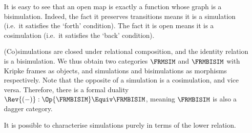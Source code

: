 It is easy to see that an open map is exactly a function whose graph is a
bisimulation. Indeed, the fact it preserves transitions means it is a simulation
(i.e.\ it satisfies the `forth' condition). The fact it is open means it is a
cosimulation (i.e.\ it satisfies the `back' condition).

(Co)simulations are closed under relational composition, and the identity
relation is a bisimulation. We thus obtain two categories \(\FRMSIM\) and
\(\FRMBISIM\) with Kripke frames as objects, and simulations and bisimulations
as morphisms respectively. Note that the opposite of a simulation is a
cosimulation, and vice versa. Therefore, there is a formal duality \(\Rev{(-)} :
\Op{\FRMBISIM} \Equiv \FRMBISIM\), meaning \(\FRMBISIM\) is also a dagger
category.

It is possible to characterise simulations purely in terms of the lower
relation.

